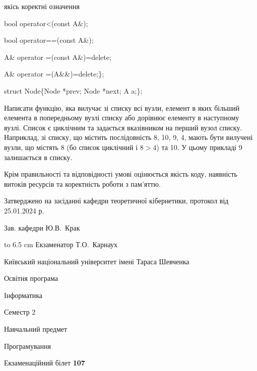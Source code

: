 \documentclass[12pt, ukrainian]{article}
\begin{document}
{\quad  якісь коректні означення 

\quad  bool operator<(const A\&); 

\quad  bool operator==(const A\&); 

\quad A\& operator =(const A\&)=delete; 

\quad  A\& operator =(A\&\&)=delete;\};

struct Node\{Node *prev; Node *next; A a;\};

Написати функцію, яка вилучає зі списку всі вузли, елемент в яких більший елемента в попередньому вузлі списку або дорівнює елементу в наступному вузлі. Список є циклічним та задається вказівником на перший вузол списку. Наприклад, зі списку, що містить послідовність 8, 10, 9, 4, мають бути вилучені вузли, що містять 8 (бо список циклічний і $8>4$) та 10. У цьому прикладі 9 залишається в списку.

Крім правильності та відповідності умові оцінюється якість коду, наявність витоків ресурсів та коректність роботи з пам'яттю. 

}
{\smallskip\smallskip \begin {scriptsize} Затверджено на засіданні кафедри теоретичної кібернетики, протокол   від   25.01.2024 р.\par\smallskip\smallskip\smallskip\smallskip
{\parbox {6.5 cm} {Зав. кафедри \dotfill Ю.В.~Крак}}\hspace {0.7cm} {\hbox to 6.5 cm { Екзаменатор \dotfill Т.О.~Карнаух}} \end{scriptsize}}
\newpage
{{\begin {scriptsize}\par
{ \center  Київський національний університет імені Тараса Шевченка \par}
{\parbox {5 cm}{Освітня програма \hfill}{\parbox {7 cm}{Інформатика\hfill}}\parbox {6 cm}{\hfill Семестр 2}}\par
{\parbox {5 cm} {Навчальний предмет \hfill}\parbox {7 cm}{Програмування \hfill}\parbox {6cm}{\hfill}\par}\vspace{-15pt} \end{scriptsize}}{\center Екзаменаційний білет \No \textbf { 107 }\par}}
\end{document}
